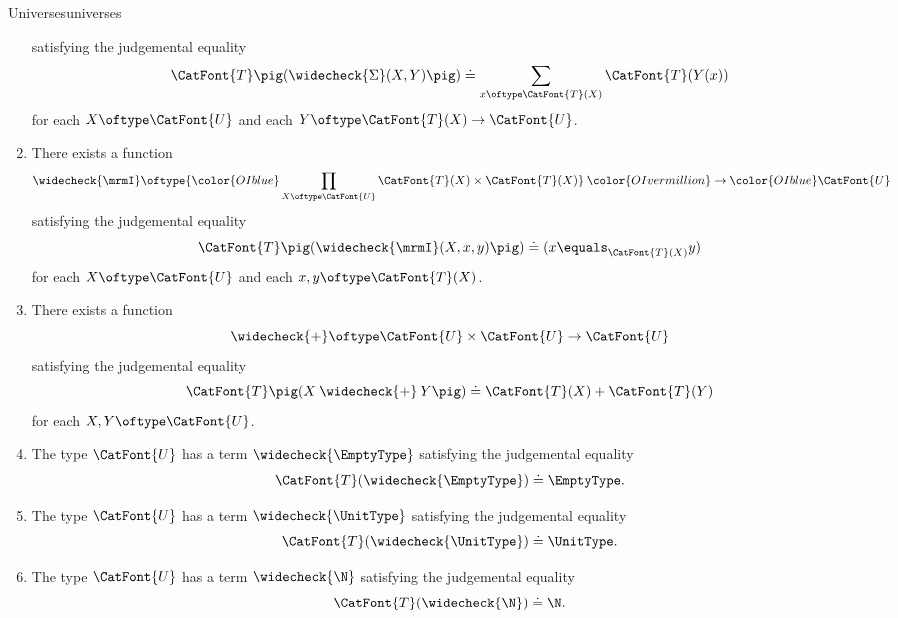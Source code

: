\begin{definition}{Universes}{universes}
\begin{enumerate}
\[            \]%
            satisfying the judgemental equality
            \[
                \CatFont{T}\pig(\widecheck{\Sigma}(X,Y)\pig)%
                \doteq%
                \sum_{x\oftype\CatFont{T}(X)}\CatFont{T}(Y(x))%
            \]%
            for each $X\oftype\CatFont{U}$ and each $Y\oftype\CatFont{T}(X)\to\CatFont{U}$.
        \item\label{universes-closure-under-identity-types}There exists a function
            \[
                \widecheck{\mrmI}%
                \oftype%
                {\color{OIblue}\prod_{X\oftype\CatFont{U}}\CatFont{T}(X)\times\CatFont{T}(X)}%
                \mathbin{\color{OIvermillion}\to}%
                {\color{OIblue}\CatFont{U}}%
            \]%
            satisfying the judgemental equality
            \[
                \CatFont{T}\pig(\widecheck{\mrmI}(X,x,y)\pig)%
                \doteq%
                (x\equals_{\CatFont{T}(X)}y)%
            \]%
            for each $X\oftype\CatFont{U}$ and each $x,y\oftype\CatFont{T}(X)$.
        \item\label{universes-closure-under-coproducts}There exists a function
            \[
                \widecheck{\mathord{+}}%
                \oftype%
                \CatFont{U}\times\CatFont{U}%
                \to%
                \CatFont{U}%
            \]%
            satisfying the judgemental equality
            \[
                \CatFont{T}\pig(X\mathbin{\widecheck{\mathord{+}}}Y\pig)%
                \doteq%
                \CatFont{T}(X)+\CatFont{T}(Y)%
            \]%
            for each $X,Y\oftype\CatFont{U}$.
        \item\label{universes-closure-under-coproducts-existence-of-empty-types}The type $\CatFont{U}$ has a term $\widecheck{\EmptyType}$ satisfying the judgemental equality
            \[
                \CatFont{T}(\widecheck{\EmptyType})%
                \doteq%
                \EmptyType.%
            \]%
        \item\label{universes-closure-under-coproducts-existence-of-unit-types}The type $\CatFont{U}$ has a term $\widecheck{\UnitType}$ satisfying the judgemental equality
            \[
                \CatFont{T}(\widecheck{\UnitType})%
                \doteq%
                \UnitType.%
            \]%
        \item\label{universes-closure-under-coproducts-existence-of-natural-numbers}The type $\CatFont{U}$ has a term $\widecheck{\N}$ satisfying the judgemental equality
            \[
                \CatFont{T}(\widecheck{\N})%
                \doteq%
                \N.%
            \]%
    \end{enumerate}
\end{definition}
